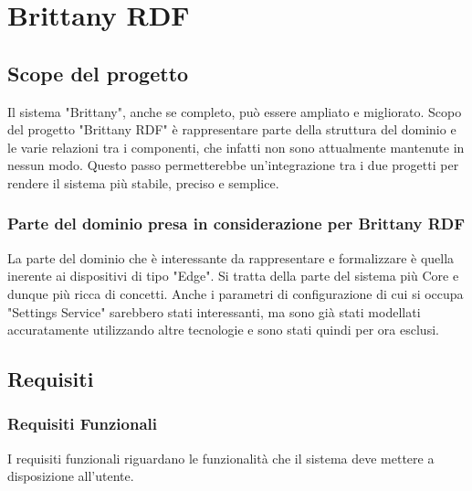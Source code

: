 \section{Brittany RDF}
\subsection{Scope del progetto}
Il sistema "Brittany", anche se completo, può essere ampliato e migliorato. Scopo del progetto "Brittany RDF" è rappresentare parte della struttura del dominio e le varie relazioni tra i componenti, che infatti non sono attualmente mantenute in nessun modo. Questo passo permetterebbe un'integrazione tra i due progetti per rendere il sistema più stabile, preciso e semplice.

\subsubsection{Parte del dominio presa in considerazione per Brittany RDF}
\noindent La parte del dominio che è interessante da rappresentare e formalizzare è quella inerente ai dispositivi di tipo "Edge". Si tratta della parte del sistema più Core e dunque più ricca di concetti. \newline
Anche i parametri di configurazione di cui si occupa "Settings Service" sarebbero stati interessanti, ma sono già stati modellati accuratamente utilizzando altre tecnologie e sono stati quindi per ora esclusi.

\subsection{Requisiti}

\subsubsection{Requisiti Funzionali}

I requisiti funzionali riguardano le funzionalità che il sistema deve mettere a disposizione all’utente.


